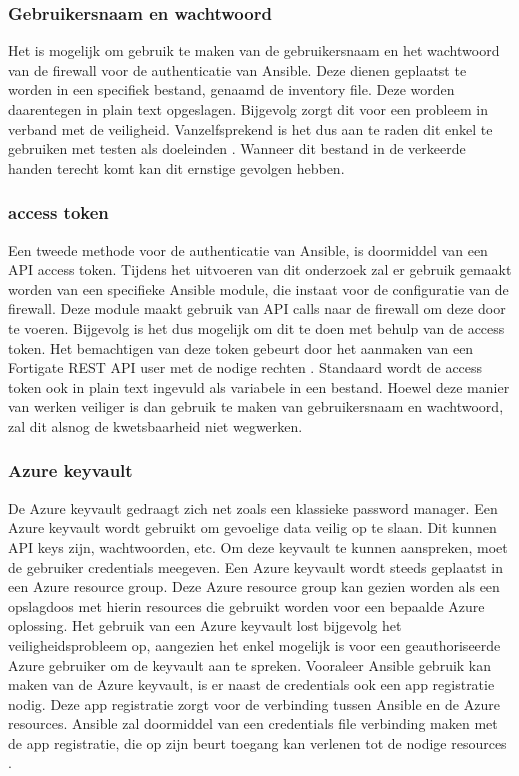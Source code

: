\subsubsection{Gebruikersnaam en wachtwoord}
Het is mogelijk om gebruik te maken van de gebruikersnaam en het wachtwoord van de firewall voor de authenticatie van Ansible. Deze dienen geplaatst te worden in een specifiek bestand, genaamd de inventory file. Deze worden daarentegen in plain text opgeslagen. Bijgevolg zorgt dit voor een probleem in verband met de veiligheid. Vanzelfsprekend is het dus aan te raden dit enkel te gebruiken met testen als doeleinden \autocite{Fortinet2021}. Wanneer dit bestand in de verkeerde handen terecht komt kan dit ernstige gevolgen hebben.

\subsubsection{access token}
Een tweede methode voor de authenticatie van Ansible, is doormiddel van een API access token. Tijdens het uitvoeren van dit onderzoek zal er gebruik gemaakt worden van een specifieke Ansible module, die instaat voor de configuratie van de firewall. Deze module maakt gebruik van API calls naar de firewall om deze door te voeren. Bijgevolg is het dus mogelijk om dit te doen met behulp van de access token. Het bemachtigen van deze token gebeurt door het aanmaken van een Fortigate REST API user met de nodige rechten \autocite{Kibali2020}. Standaard wordt de access token ook in plain text ingevuld als variabele in een bestand. Hoewel deze manier van werken veiliger is dan gebruik te maken van gebruikersnaam en wachtwoord, zal dit alsnog de kwetsbaarheid niet wegwerken. 

\subsubsection{Azure keyvault}
De Azure keyvault gedraagt zich net zoals een klassieke password manager. Een Azure keyvault wordt gebruikt om gevoelige data veilig op te slaan. Dit kunnen API keys zijn, wachtwoorden, etc. Om deze keyvault te kunnen aanspreken, moet de gebruiker credentials meegeven. Een Azure keyvault wordt steeds geplaatst in een Azure resource group. Deze Azure resource group kan gezien worden als een opslagdoos met hierin resources die gebruikt worden voor een bepaalde Azure oplossing. Het gebruik van een Azure keyvault lost bijgevolg het veiligheidsprobleem op, aangezien het enkel mogelijk is voor een geauthoriseerde Azure gebruiker om de keyvault aan te spreken. Vooraleer Ansible gebruik kan maken van de Azure keyvault, is er naast de credentials ook een app registratie nodig. Deze app registratie zorgt voor de verbinding tussen Ansible en de Azure resources. Ansible zal doormiddel van een credentials file verbinding maken met de app registratie, die op zijn beurt toegang kan verlenen tot de nodige resources \autocite{Bertram2020}. 





